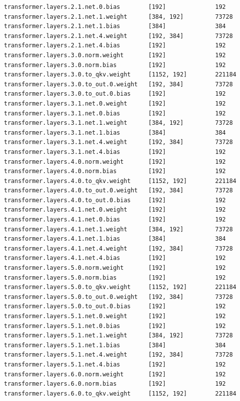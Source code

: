 \documentclass[notitlepage,cs4size,punct,oneside]{ctexrep}
\numberwithin{equation}{chapter}
\theoremstyle{mystyle}
\begin{document}
\begin{appendices}
{\begin{lstlisting}[style=output]
transformer.layers.2.1.net.0.bias        [192]              192
transformer.layers.2.1.net.1.weight      [384, 192]         73728
transformer.layers.2.1.net.1.bias        [384]              384
transformer.layers.2.1.net.4.weight      [192, 384]         73728
transformer.layers.2.1.net.4.bias        [192]              192
transformer.layers.3.0.norm.weight       [192]              192
transformer.layers.3.0.norm.bias         [192]              192
transformer.layers.3.0.to_qkv.weight     [1152, 192]        221184
transformer.layers.3.0.to_out.0.weight   [192, 384]         73728
transformer.layers.3.0.to_out.0.bias     [192]              192
transformer.layers.3.1.net.0.weight      [192]              192
transformer.layers.3.1.net.0.bias        [192]              192
transformer.layers.3.1.net.1.weight      [384, 192]         73728
transformer.layers.3.1.net.1.bias        [384]              384
transformer.layers.3.1.net.4.weight      [192, 384]         73728
transformer.layers.3.1.net.4.bias        [192]              192
transformer.layers.4.0.norm.weight       [192]              192
transformer.layers.4.0.norm.bias         [192]              192
transformer.layers.4.0.to_qkv.weight     [1152, 192]        221184
transformer.layers.4.0.to_out.0.weight   [192, 384]         73728
transformer.layers.4.0.to_out.0.bias     [192]              192
transformer.layers.4.1.net.0.weight      [192]              192
transformer.layers.4.1.net.0.bias        [192]              192
transformer.layers.4.1.net.1.weight      [384, 192]         73728
transformer.layers.4.1.net.1.bias        [384]              384
transformer.layers.4.1.net.4.weight      [192, 384]         73728
transformer.layers.4.1.net.4.bias        [192]              192
transformer.layers.5.0.norm.weight       [192]              192
transformer.layers.5.0.norm.bias         [192]              192
transformer.layers.5.0.to_qkv.weight     [1152, 192]        221184
transformer.layers.5.0.to_out.0.weight   [192, 384]         73728
transformer.layers.5.0.to_out.0.bias     [192]              192
transformer.layers.5.1.net.0.weight      [192]              192
transformer.layers.5.1.net.0.bias        [192]              192
transformer.layers.5.1.net.1.weight      [384, 192]         73728
transformer.layers.5.1.net.1.bias        [384]              384
transformer.layers.5.1.net.4.weight      [192, 384]         73728
transformer.layers.5.1.net.4.bias        [192]              192
transformer.layers.6.0.norm.weight       [192]              192
transformer.layers.6.0.norm.bias         [192]              192
transformer.layers.6.0.to_qkv.weight     [1152, 192]        221184

\end{lstlisting}}
\end{appendices}
\end{document}
